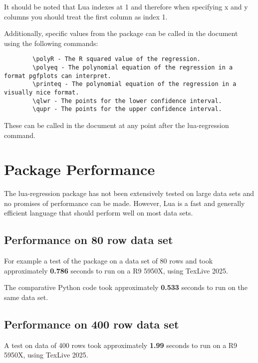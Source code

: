 \documentclass[11pt]{article}
\begin{document}
    \noindent
    \begin{warningbox}
    It should be noted that Lua indexes at 1 and therefore when specifying x and y columns you should treat the first column as index 1.
    \end{warningbox}

    \noindent
    Additionally, specific values from the package can be called in the document using the following commands:

    \begin{verbatim}
        \polyR - The R squared value of the regression.
        \polyeq - The polynomial equation of the regression in a format pgfplots can interpret.
        \printeq - The polynomial equation of the regression in a visually nice format.
        \qlwr - The points for the lower confidence interval.
        \qupr - The points for the upper confidence interval.
    \end{verbatim}

    \noindent
    These can be called in the document at any point after the {\ttfamily lua-regression} command.

    \section{Package Performance}

    The {\ttfamily lua-regression} package has not been extensively tested on large data sets and no promises of performance can be made.
    However, Lua is a fast and generally efficient language that should perform well on most data sets.

    \subsection{Performance on 80 row data set}

    For example a test of the package on a data set of 80 rows and took approximately \textbf{0.786} seconds to run on a R9 5950X, using TexLive 2025.
   
    The comparative Python code took approximately \textbf{0.533} seconds to run on the same data set.

    \subsection{Performance on 400 row data set}

    A test on data of 400 rows took approximately \textbf{1.99} seconds to run on a R9 5950X, using TexLive 2025.
    
\end{document}
